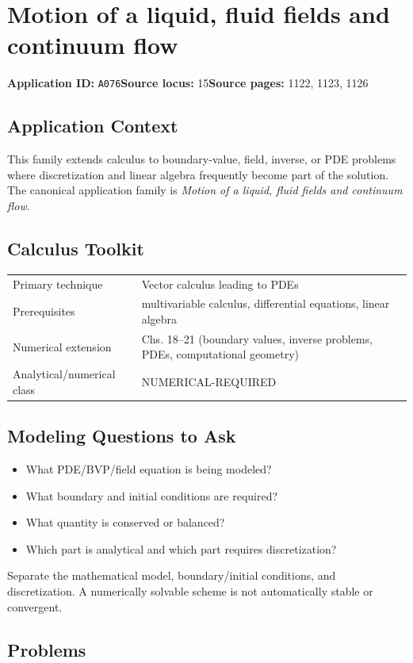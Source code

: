 \documentclass[11pt]{book}
\newcommand{\pid}[1]{\texttt{#1}}
\begin{document}
\chapter{Motion of a liquid, fluid fields and continuum flow}\label{app:A076}
\textbf{Application ID:} \pid{A076}\quad \textbf{Source locus:} 15\quad \textbf{Source pages:} 1122, 1123, 1126
\section*{Application Context}
This family extends calculus to boundary-value, field, inverse, or PDE problems where discretization and linear algebra frequently become part of the solution. The canonical application family is \emph{Motion of a liquid, fluid fields and continuum flow}.
\section*{Calculus Toolkit}
\begin{tabularx}{\textwidth}{@{}lX@{}}\toprule
Primary technique & Vector calculus leading to PDEs \\
Prerequisites & multivariable calculus, differential equations, linear algebra \\
Numerical extension & Chs. 18–21 (boundary values, inverse problems, PDEs, computational geometry) \\
Analytical/numerical class & NUMERICAL-REQUIRED \\
\bottomrule\end{tabularx}
\section*{Modeling Questions to Ask}\begin{itemize}
\item What PDE/BVP/field equation is being modeled?
\item What boundary and initial conditions are required?
\item What quantity is conserved or balanced?
\item Which part is analytical and which part requires discretization?
\end{itemize}
\begin{errorbox}Separate the mathematical model, boundary/initial conditions, and discretization. A numerically solvable scheme is not automatically stable or convergent.\end{errorbox}
\section*{Problems}
\end{document}
